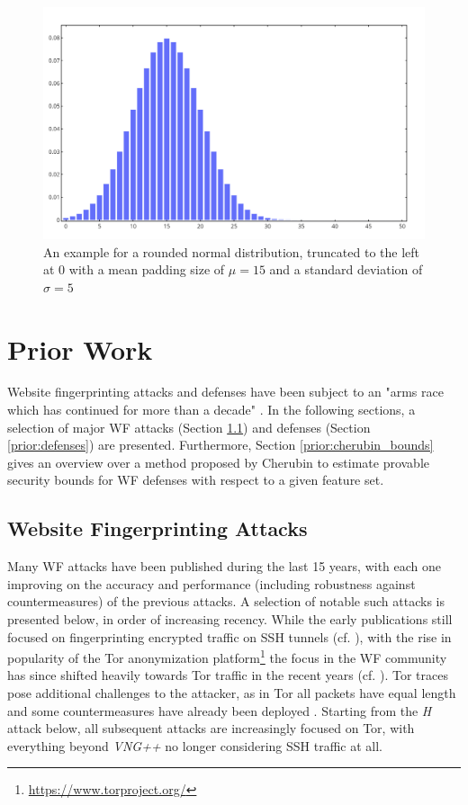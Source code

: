 \documentclass[
	ruledheaders=chapter,
	class=report,
	thesis={type=master, department=inf},
	accentcolor=1c,
	custommargins=true,
	marginpar=false,
	parskip=half-,
	fontsize=11pt,
]{tudapub}
\begin{document}
	\begin{figure}[tb]
		\centering
		\includegraphics[width=\textwidth]{truncated_rounded_normal.png}
		\caption{An example for a rounded normal distribution, truncated to the left at 0 with a mean padding size of $\mu = 15$ and a standard deviation of $\sigma = 5$ }
		\label{fig:trunc_gauss}
	\end{figure}

	\chapter{Prior Work}
	\label{prior}
	
	Website fingerprinting attacks and defenses have been subject to an "arms race which has continued for more than a decade" \cite{Cherubin2017}. In the following sections, a selection of major WF attacks (Section \ref{prior:attacks}) and defenses (Section \ref{prior:defenses}) are presented. Furthermore, Section \ref{prior:cherubin_bounds} gives an overview over a method proposed by Cherubin \cite{Cherubin2017} to estimate provable security bounds for WF defenses with respect to a given feature set.
	
	\section{Website Fingerprinting Attacks}
	\label{prior:attacks}
	
	Many WF attacks have been published during the last 15 years, with each one improving on the accuracy and performance (including robustness against countermeasures) of the previous attacks. A selection of notable such attacks is presented below, in order of increasing recency. While the early publications still focused on fingerprinting encrypted traffic on SSH tunnels (cf. \cite{Liberatore2006,Herrmann2009,Panchenko2011,Dyer2012}), with the rise in popularity of the Tor anonymization platform\footnote{\url{https://www.torproject.org/}} the focus in the WF community has since shifted heavily towards Tor traffic in the recent years (cf. \cite{Dyer2012,Wang2014,Panchenko2016,Hayes2016,Sirinam2018,Wang2021}). Tor traces pose additional challenges to the attacker, as in Tor all packets have equal length and some countermeasures have already been deployed \cite{Perry2011}. Starting from the \textit{H} attack below, all subsequent attacks are increasingly focused on Tor, with everything beyond \textit{VNG++} no longer considering SSH traffic at all.
	
\end{document}
